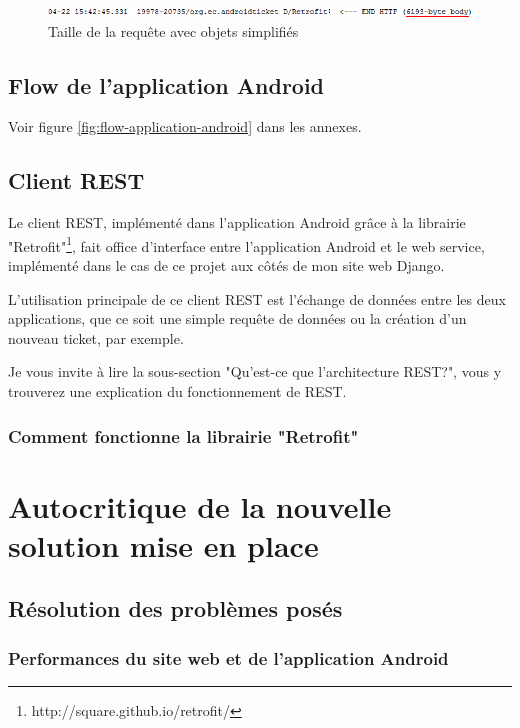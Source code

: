 \documentclass[12pt,table,a4paper]{report}
\begin{document}
\begin{figure}[t]
\centering
\includegraphics[width=1.0\textwidth]{images/screenshots/proofs/comparaison-rest-simple-ticket.png}
\caption{Taille de la requête avec objets simplifiés}
\label{fig:rest-simple-ticket}
\end{figure}

\subsection{Flow de l'application Android}
Voir figure \ref{fig:flow-application-android} dans les annexes.


\subsection{Client REST}
Le client REST, implémenté dans l'application Android grâce à la librairie "Retrofit"\footnote{http://square.github.io/retrofit/}, fait office d'interface entre l'application Android et le web service, implémenté dans le cas de ce projet aux côtés de mon site web Django.

L'utilisation principale de ce client REST est l'échange de données entre les deux applications, que ce soit une simple requête de données ou la création d'un nouveau ticket, par exemple.

Je vous invite à lire la sous-section "Qu'est-ce que l'architecture REST?", vous y trouverez une explication du fonctionnement de REST.

\subsubsection{Comment fonctionne la librairie "Retrofit"}
\todo{}

\section{Autocritique de la nouvelle solution mise en place}
\subsection{Résolution des problèmes posés}
\subsubsection{Performances du site web et de l'application Android}
\end{document}
